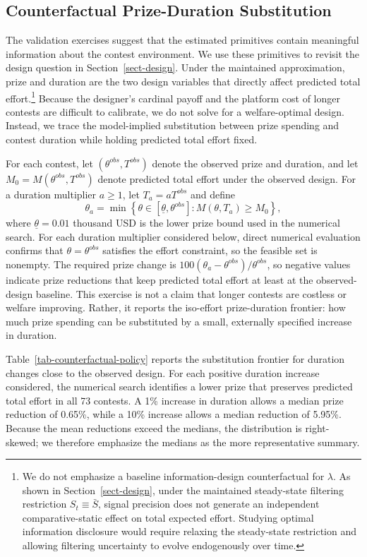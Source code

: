 \documentclass[mnsc]{informs3}
\begin{document}
\subsection{Counterfactual Prize-Duration Substitution}

The validation exercises suggest that the estimated primitives contain
meaningful information about the contest environment. We use these primitives to
revisit the design question in Section~\ref{sect-design}. Under the maintained
approximation, prize and duration are the two design variables that directly
affect predicted total effort.\footnote{
We do not emphasize a baseline information-design counterfactual for
$\lambda$. As shown in Section~\ref{sect-design}, under the maintained
steady-state filtering restriction $S_t\equiv\bar S$, signal precision does not
generate an independent comparative-static effect on total expected effort.
Studying optimal information disclosure would require relaxing the steady-state
restriction and allowing filtering uncertainty to evolve endogenously over time.
}
Because the designer's cardinal payoff and the platform cost of longer contests
are difficult to calibrate, we do not solve for a welfare-optimal design.
Instead, we trace the model-implied substitution between prize spending and
contest duration while holding predicted total effort fixed.

For each contest, let $(\theta^{obs},T^{obs})$ denote the observed prize and
duration, and let
$M_0=M(\theta^{obs},T^{obs})$ denote predicted total effort under the observed
design. For a duration multiplier $a\geq1$, let $T_a=aT^{obs}$ and define
\[
\theta_a
=
\min\left\{
\theta\in[\underline\theta,\theta^{obs}]
:
M(\theta,T_a)\geq M_0
\right\},
\]
where $\underline\theta=0.01$ thousand USD is the lower prize bound used in the numerical search. For each duration multiplier considered below, direct numerical evaluation confirms that $\theta=\theta^{obs}$ satisfies the effort constraint, so the feasible set is nonempty.
The required prize change is
$100(\theta_a-\theta^{obs})/\theta^{obs}$, so negative values indicate prize
reductions that keep predicted total effort at least at the observed-design
baseline. This exercise is not a claim that longer contests are costless or
welfare improving. Rather, it reports the iso-effort prize-duration frontier:
how much prize spending can be substituted by a small, externally specified increase in duration.

Table~\ref{tab-counterfactual-policy} reports the substitution frontier for duration changes close to the observed design. For each positive duration increase considered, the numerical search identifies a lower prize that preserves predicted total effort in all 73 contests. A 1\% increase in duration allows a median prize reduction of 0.65\%, while a 10\% increase allows a median reduction of 5.95\%. Because the mean reductions exceed the medians, the distribution is right-skewed; we therefore emphasize the medians as the more representative summary.
\end{document}
